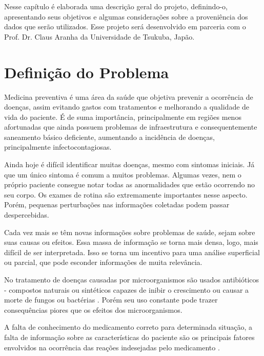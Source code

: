 Nesse capítulo é elaborada uma descrição geral do projeto, definindo-o, apresentando
seus objetivos e algumas considerações sobre a proveniência dos dados que serão 
utilizados. Esse projeto será desenvolvido em parceria com o Prof. Dr. Claus Aranha da 
Universidade de Tsukuba, Japão.

\section{Definição do Problema}%
Medicina preventiva é uma área da saúde que objetiva prevenir a ocorrência de doenças, 
assim evitando gastos com tratamentos e melhorando a qualidade de vida do paciente. É 
de suma importância, principalmente em regiões menos afortunadas que ainda possuem 
problemas de infraestrutura e consequentemente saneamento básico deficiente, aumentando 
a incidência de doenças, principalmente infectocontagiosas.

Ainda hoje é difícil identificar muitas doenças, mesmo com sintomas iniciais. Já que um 
único sintoma é comum a muitos problemas. Algumas vezes, nem o próprio paciente 
consegue notar todas as anormalidades que estão ocorrendo no seu corpo. Os exames de 
rotina são extremamente importantes nesse aspecto. Porém, pequenas perturbações nas 
informações coletadas podem passar despercebidas.

Cada vez mais se têm novas informações sobre problemas de saúde, sejam sobre suas 
causas ou efeitos. Essa massa de informação se torna mais densa, logo, mais difícil de 
ser interpretada. Isso se torna um incentivo para uma análise superficial ou parcial, 
que pode esconder informações de muita relevância.

No tratamento de doenças causadas por microorganismos são usados antibióticos - compostos 
naturais ou sintéticos capazes de inibir o crescimento ou causar a morte de fungos ou 
bactérias \cite{antibioticos}. Porém seu uso constante pode trazer consequências piores
que os efeitos dos microorganismos.

A falta de conhecimento do medicamento correto para determinada situação, a falta de 
informação sobre as características do paciente são os principais fatores envolvidos 
na ocorrência das reações indesejadas pelo medicamento \cite{antibioticos1}.

